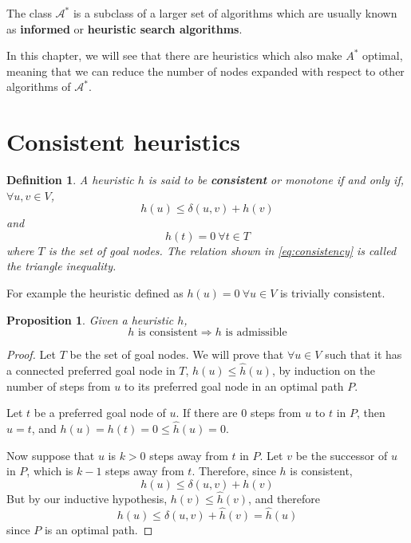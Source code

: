 \documentclass[a4paper,10pt]{report}
\newtheorem{definition}[theorem]{Definition}
\newtheorem{proposition}[theorem]{Proposition}
\begin{document}
The class $\mathcal{A^*}$ is a subclass of a larger set of algorithms which are usually known as \textbf{informed} or \textbf{heuristic search algorithms}.

In this chapter, we will see that there are heuristics which also make $A^*$ optimal, meaning that we can reduce the number of nodes expanded with respect to other algorithms of $\mathcal{A^*}$.

\section{Consistent heuristics}

\begin{definition}
A heuristic $h$ is said to be \textbf{consistent} or monotone if and only if, $\forall u, v \in V$,
\begin{equation}
	h(u) \leq \delta(u, v) + h(v)\label{eq:consistency}
\end{equation}
and
\begin{equation}
	h(t) = 0 \  \forall t \in T
\end{equation}
where $T$ is the set of goal nodes.
The relation shown in \ref{eq:consistency} is called the triangle inequality.
\end{definition}

For example the heuristic defined as $h(u) = 0 \  \forall u \in V$ is trivially consistent.

\begin{proposition}
\label{prop:consistent}
Given a heuristic $h$,
\[ h \text{ is consistent} \Rightarrow h \text{ is admissible} \]
\end{proposition}
\begin{proof}
Let $T$ be the set of goal nodes. We will prove that $\forall u \in V$ such that it has a connected preferred goal node in $T$, $h(u) \leq \hat{h}(u)$, by induction on the number of steps from $u$ to its preferred goal node in an optimal path $P$.

Let $t$ be a preferred goal node of $u$. If there are 0 steps from $u$ to $t$ in $P$, then $u = t$, and $h(u) = h(t) = 0 \leq \hat{h}(u) = 0$.

Now suppose that $u$ is $k > 0$ steps away from $t$ in $P$. Let $v$ be the successor of $u$ in $P$, which is $k-1$ steps away from $t$. Therefore, since $h$ is consistent,
\[ h(u) \leq \delta(u, v) + h(v) \]
But by our inductive hypothesis, $h(v) \leq \hat{h}(v)$, and therefore
\[ h(u) \leq \delta(u, v) + \hat{h}(v) = \hat{h}(u) \]
since $P$ is an optimal path.
\end{proof}
\end{document}
